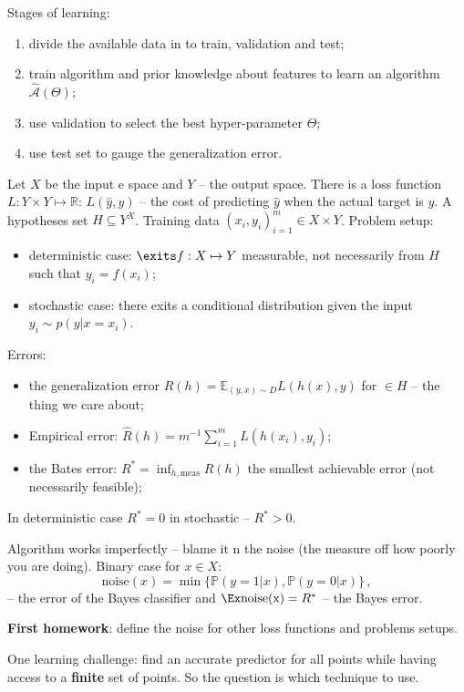 \documentclass[a4paper]{article}
\newcommand{\Real}{\mathbb{R}}
\newcommand{\ex}{\mathbb{E}}
\newcommand{\pr}{\mathbb{P}}
\begin{document}
Stages of learning: \begin{enumerate}
	\item divide the available data in to train, validation and test;
	\item train algorithm and prior knowledge about features to learn an algorithm
	$\hat{\mathcal{A}}(\Theta)$;
	\item use validation to select the best hyper-parameter $\Theta$;
	\item use test set to gauge the generalization error.
\end{enumerate}

Let $X$ be the input e space and $Y$ -- the output space. There is a loss function
$L: Y\times Y \mapsto \Real$: $L(\hat{y}, y)$ -- the cost of predicting $\hat{y}$
when the actual target is $y$. A hypotheses set $H\subseteq Y^X$. Training data
$(x_i,y_i)_{i=1}^m \in X\times Y$.
Problem setup: \begin{itemize}
	\item deterministic case: $\exits f:X\mapsto Y$ measurable, not necessarily from
	$H$ such that $y_i = f(x_i)$;
	\item stochastic case: there exits a conditional distribution given the
	input $y_i \sim p(y|x=x_i)$.
\end{itemize}

Errors: \begin{itemize}
	\item the generalization error $R(h) = \ex_{(y, x)\sim D} L(h(x), y)$ for $\in H$
	-- the thing we care about;
	\item Empirical error: $\hat{R}(h) = m^{-1} \sum_{i=1}^m L(h(x_i), y_i)$;
	\item the Bates error: $R^* = \inf_{h, \text{meas}} R(h)$ the smallest achievable
	error (not necessarily feasible);
\end{itemize}
In deterministic case $R^*=0$ in stochastic -- $R^*>0$.

Algorithm works imperfectly -- blame it n the noise (the measure off how poorly you
are doing). Binary case for $x\in X$:
\[ \text{noise}(x) = \min\bigl\{\pr(y=1|x), \pr(y=0|x)\bigr\} \,, \]
-- the error of the Bayes classifier and $\Ex \text{noise(x)} = R^*$ -- the Bayes
error.

\textbf{First homework}: define the noise for other loss functions and problems
setups.

One learning challenge: find an accurate predictor for all points while having access
to a \textbf{finite} set of points. So the question is which technique to use.
\end{document}
